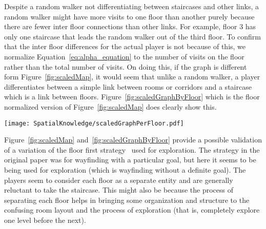 Despite a random walker not differentiating between staircases and other links, a random walker might have more visits to one floor than another purely because there are fewer inter floor connections than other links. For example, floor 3 has only one staircase that leads the random walker out of the third floor. To confirm that the inter floor differences for the actual player is not because of this, we normalize Equation~\ref{eq:alpha_equation} to the number of visits on the floor rather than the total number of visits. On doing this, if the graph is different form Figure~\ref{fig:scaledMap}, it would seem that unlike a random walker, a player differentiates between a simple link between rooms or corridors and a staircase which is a link between floors. Figure~\ref{fig:scaledGraphByFloor} which is the floor normalized version of Figure~\ref{fig:scaledMap} does clearly show this.


\begin{sidewaysfigure*}[!htbp]
\centering
\texttt{[image: SpatialKnowledge/scaledGraphPerFloor.pdf]}
\caption[Room visit frequencies normalized to floor]{Figure~\ref{fig:scaledMap} normalized to floor instead of the total number of visits. The fact that this graph is different from Figure~\ref{fig:scaledMap} indicates that, unlike a random walker, a player differentiates between a simple link between rooms or corridors and a staircase which links two floors.}
\label{fig:scaledGraphByFloor}
\end{sidewaysfigure*}

Figure~\ref{fig:scaledMap} and~\ref{fig:scaledGraphByFloor} provide a possible validation of a variation of the floor first strategy~\cite{HolscherBMS06} used for exploration. The strategy in the original paper was for wayfinding with a particular goal, but here it seems to be being used for exploration (which is wayfinding without a definite goal). The players seem to consider each floor as a separate entity and are generally reluctant to take the staircase. This might also be because the process of separating each floor helps in bringing some organization and structure to the confusing room layout and the process of exploration (that is, completely explore one level before the next).

